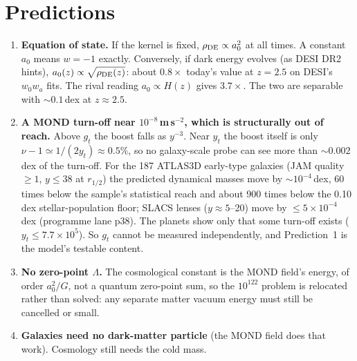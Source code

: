 \documentclass[10pt]{article}
\begin{document}
\section{Predictions}
\begin{enumerate}
\item \textbf{Equation of state.} If the kernel is fixed, $\rho_{\rm DE}\propto a_0^2$ at all times. A constant $a_0$ means $w=-1$ exactly. Conversely, if dark energy evolves (as DESI DR2 hints), $a_0(z)\propto\sqrt{\rho_{\rm DE}(z)}$: about $0.8\times$ today's value at $z=2.5$ on DESI's $w_0w_a$ fits. The rival reading $a_0\propto H(z)$ gives $3.7\times$. The two are separable with $\sim0.1$\,dex at $z\approx2.5$.
\item \textbf{A MOND turn-off near $10^{-8}$\,m\,s$^{-2}$, which is structurally out of reach.} Above $g_t$ the boost falls as $y^{-3}$. Near $y_t$ the boost itself is only $\nu-1\simeq1/(2y_t)\approx0.5\%$, so no galaxy-scale probe can see more than $\sim0.002$\,dex of the turn-off. For the 187 ATLAS3D early-type galaxies (JAM quality $\ge1$, $y\le38$ at $r_{1/2}$) the predicted dynamical masses move by $\sim10^{-4}$\,dex, 60 times below the sample's statistical reach and about 900 times below the 0.10\,dex stellar-population floor; SLACS lenses ($y\approx5$--20) move by $\le5\times10^{-4}$\,dex (programme lane p38). The planets show only that some turn-off exists ($y_t\le7.7\times10^5$). So $g_t$ cannot be measured independently, and Prediction~1 is the model's testable content.
\item \textbf{No zero-point $\Lambda$.} The cosmological constant is the MOND field's energy, of order $a_0^2/G$, not a quantum zero-point sum, so the $10^{122}$ problem is relocated rather than solved: any separate matter vacuum energy must still be cancelled or small.
\item \textbf{Galaxies need no dark-matter particle} (the MOND field does that work). Cosmology still needs the cold mass.
\end{enumerate}
\end{document}
